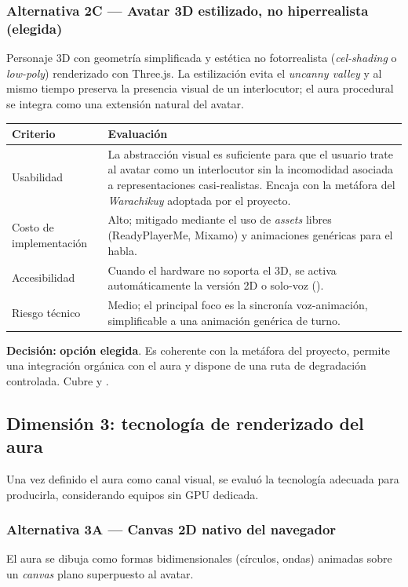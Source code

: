 \subsubsection*{Alternativa 2C — Avatar 3D estilizado, no hiperrealista (elegida)}
Personaje 3D con geometría simplificada y estética no fotorrealista
(\textit{cel-shading} o \textit{low-poly}) renderizado con Three.js.
La estilización evita el \textit{uncanny valley} y al mismo tiempo
preserva la presencia visual de un interlocutor; el aura procedural
se integra como una extensión natural del avatar.

\begin{table}[ht]
\centering\footnotesize
\renewcommand{\arraystretch}{1.2}
\begin{tabularx}{\linewidth}{@{}p{3.6cm} Y@{}}
\toprule
\textbf{Criterio} & \textbf{Evaluación} \\
\midrule
Usabilidad & La abstracción visual es suficiente para que el usuario
trate al avatar como un interlocutor sin la incomodidad asociada a
representaciones casi-realistas. Encaja con la metáfora del
\textit{Warachikuy} adoptada por el proyecto. \\
Costo de implementación & Alto; mitigado mediante el uso de
\textit{assets} libres (ReadyPlayerMe, Mixamo) y animaciones
genéricas para el habla. \\
Accesibilidad & Cuando el hardware no soporta el 3D, se activa
automáticamente la versión 2D o solo-voz (). \\
Riesgo técnico & Medio; el principal foco es la sincronía
voz-animación, simplificable a una animación genérica de turno. \\
\bottomrule
\end{tabularx}
\end{table}

\noindent\textbf{Decisión:} \textbf{opción elegida}. Es coherente con
la metáfora del proyecto, permite una integración orgánica con el
aura y dispone de una ruta de degradación controlada. Cubre 
y .

\subsection{Dimensión 3: tecnología de renderizado del aura}

Una vez definido el aura como canal visual, se evaluó la tecnología
adecuada para producirla, considerando equipos sin GPU dedicada.

\subsubsection*{Alternativa 3A — Canvas 2D nativo del navegador}
El aura se dibuja como formas bidimensionales (círculos, ondas)
animadas sobre un \textit{canvas} plano superpuesto al avatar.

